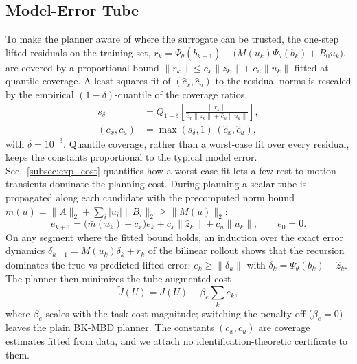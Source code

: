 \documentclass[lettersize,journal]{IEEEtran}
\theoremstyle{remark}
\newcommand{\bkmbd}{\textsc{BK-MBD}}
\begin{document}
\subsection{Model-Error Tube}\label{subsec:tube}

To make the planner aware of where the surrogate can be trusted, the
one-step lifted residuals on the training set,
$r_k = \Psi_\theta(b_{k+1}) - \big(M(u_k)\Psi_\theta(b_k) + B_0 u_k\big)$,
are covered by a proportional bound
$\|r_k\| \le c_x \|z_k\| + c_u \|u_k\|$ fitted at quantile coverage. A
least-squares fit of $(\hat c_x, \hat c_u)$ to the residual norms is
rescaled by the empirical $(1-\delta)$-quantile of the coverage ratios,
\begin{equation}
\begin{aligned}
s_\delta &= Q_{1-\delta}\!\left[
\frac{\|r_k\|}{\hat c_x \|z_k\| + \hat c_u \|u_k\|}
\right], \\
(c_x, c_u) &= \max(s_\delta, 1) \,(\hat c_x, \hat c_u),
\end{aligned}
\label{eq:tubefit}
\end{equation}
with $\delta = 10^{-3}$. Quantile coverage, rather than a worst-case fit
over every residual, keeps the constants proportional to the typical
model error. Sec.~\ref{subsec:exp_cost} quantifies how a worst-case fit
lets a few rest-to-motion transients dominate the planning cost.
During planning a scalar tube is propagated along each candidate with the
precomputed norm bound
$\bar m(u) = \|A\|_2 + \sum_i |u_i| \|B_i\|_2 \ge \|M(u)\|_2$:
\begin{equation}
e_{k+1} = \big(\bar m(u_k) + c_x\big) e_k
+ c_x \|\hat z_k\| + c_u \|u_k\|,
\qquad e_0 = 0 .
\label{eq:tube}
\end{equation}
On any segment where the fitted bound holds, an induction over the exact
error dynamics $\delta_{k+1} = M(u_k)\delta_k + r_k$ of the bilinear
rollout shows that the recursion dominates the true-vs-predicted lifted
error: $e_k \ge \|\delta_k\|$ with
$\delta_k = \Psi_\theta(b_k) - \hat z_k$.
The planner then minimizes the tube-augmented cost
\begin{equation}
\tilde J(U) = J(U) + \beta_e \sum_{k} e_k ,
\label{eq:tubecost}
\end{equation}
where $\beta_e$ scales with the task cost magnitude; switching the
penalty off ($\beta_e = 0$) leaves the plain \bkmbd{} planner. The
constants $(c_x, c_u)$ are coverage estimates fitted from data, and we
attach no identification-theoretic certificate to them.
\end{document}
